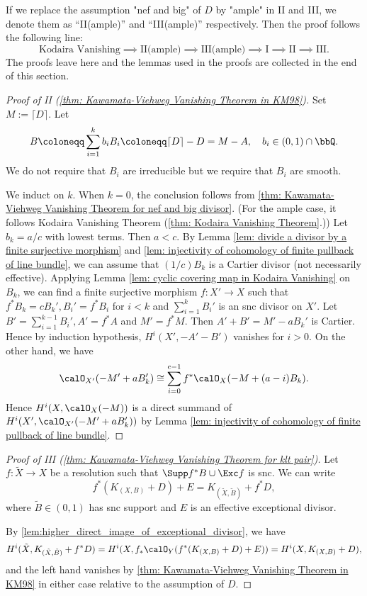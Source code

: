     If we replace the assumption "nef and big" of \(D\) by "ample" in II and III, we denote them as ``II(ample)'' and ``III(ample)'' respectively.
    Then the proof follows the following line:
    \[ \text{Kodaira Vanishing} \implies \text{II(ample)} \implies \text{III(ample)} \implies \text{I} \implies \text{II} \implies \text{III}. \]
    The proofs leave here and the lemmas used in the proofs are collected in the end of this section.
    
    \begin{proof}[Proof of II (\cref{thm: Kawamata-Viehweg Vanishing Theorem in KM98})]
        Set \(M:= \lceil D \rceil\).
        Let 
        \[ B \coloneqq \sum_{i=1}^k b_i B_i \coloneqq \lceil D \rceil - D = M - A, \quad b_i \in (0,1) \cap \bbQ. \]
        We do not require that \(B_i\) are irreducible but we require that \(B_i\) are smooth.

        We induct on \(k\).
        When \(k = 0\), the conclusion follows from \cref{thm: Kawamata-Viehweg Vanishing Theorem for nef and big divisor}.
        (For the ample case, it follows Kodaira Vanishing Theorem (\cref{thm: Kodaira Vanishing Theorem}.))
        Let \(b_k = a/c\) with lowest terms.
        Then \(a<c\).
        By Lemma \ref{lem: divide a divisor by a finite surjective morphism} and \ref{lem: injectivity of cohomology of finite pullback of line bundle}, we can assume that \((1/c)B_k\) is a Cartier divisor (not necessarily effective).
        Applying Lemma \ref{lem: cyclic covering map in Kodaira Vanishing} on \(B_k\),
        we can find a finite surjective morphism \(f: X' \to X\) such that \(f^*B_k = cB_k', B_i' = f^*B_i\) for \(i < k\) and \(\sum_{i=1}^{k} B_i'\) is an snc divisor on \(X'\).
        Let \(B' = \sum_{i=1}^{k-1}B_i', A' = f^*A\) and \(M' = f^*M\).
        Then \(A'+ B' =  M'-aB_k'\) is Cartier.
        Hence by induction hypothesis, \( H^i(X', -A' - B')\) vanishes for \(i > 0\).
        On the other hand, we have
        \[ \calO_{X'}(-M' + aB_k') \cong \sum_{i=0}^{c-1} f^*\calO_X(-M + (a-i) B_k). \]
        Hence \(H^i(X,\calO_X(-M))\) is a direct summand of \(H^i(X', \calO_{X'}(-M' + aB_k'))\) by Lemma \ref{lem: injectivity of cohomology of finite pullback of line bundle}.
    \end{proof}
    \begin{proof}[Proof of III (\cref{thm: Kawamata-Viehweg Vanishing Theorem for klt pair})]
        Let \(f: \tilde{X} \to X\) be a resolution such that \(\Supp f^*B \cup \Exc f\) is snc.
        We can write
        \[ f^*(K_{(X,B)} + D) + E = K_{(\tilde{X},\tilde{B})} + f^*D, \]
        where \(\tilde{B} \in (0,1)\) has snc support and \(E\) is an effective exceptional divisor.

        By \cref{lem:higher_direct_image_of_exceptional_divisor}, we have 
        \[ H^i(\tilde{X}, K_{(\tilde{X},\tilde{B})} + f^*D) = H^i(X, f_*\calO_Y(f^*(K_{(X,B)}+D)+E)) = H^i(X, K_{(X,B)}+D), \] 
        and the left hand vanishes by \cref{thm: Kawamata-Viehweg Vanishing Theorem in KM98} in either case relative to the assumption of \(D\).
    \end{proof}
